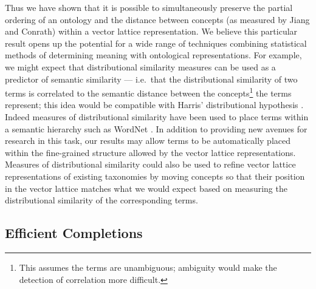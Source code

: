 Thus we have shown that it is possible to simultaneously preserve the partial ordering of an ontology and the distance between concepts (as measured by Jiang and Conrath) within a vector lattice representation. We believe this particular result opens up the potential for a wide range of techniques combining statistical methods of determining meaning with ontological representations. For example, we might expect that distributional similarity measures can be used as a predictor of semantic similarity --- i.e.~that the distributional similarity of two terms is correlated to the semantic distance between the concepts\footnote{This assumes the terms are unambiguous; ambiguity would make the detection of correlation more difficult.} the terms represent; this idea would be compatible with Harris' distributional hypothesis \citep{Harris:68}.
Indeed measures of distributional similarity have been used to place terms within a semantic hierarchy such as WordNet \citep{Alfonseca:02, Pekar:03}. In addition to providing new avenues for research in this task, our results may allow terms to be automatically placed within the fine-grained structure allowed by the vector lattice representations. Measures of distributional similarity could also be used to refine vector lattice representations of existing taxonomies by moving concepts so that their position in the vector lattice matches what we would expect based on measuring the distributional similarity of the corresponding terms.


\subsection{Efficient Completions}
\label{efficient-completions-section}

